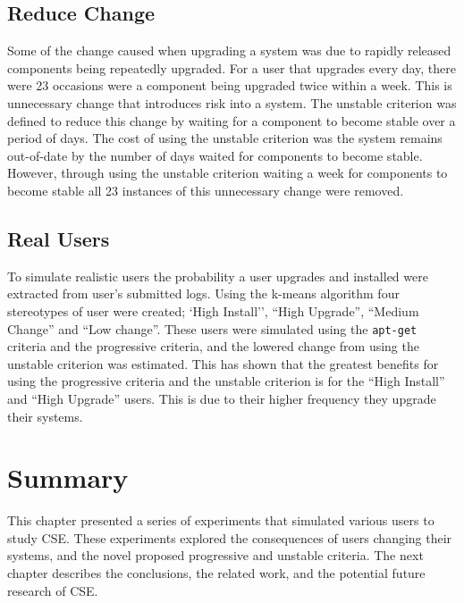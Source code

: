 \subsection{Reduce Change}
Some of the change caused when upgrading a system was due to rapidly released components being repeatedly upgraded.
For a user that upgrades every day, there were 23 occasions were a component being upgraded twice within a week.
This is unnecessary change that introduces risk into a system. 
The unstable criterion was defined to reduce this change by waiting for a component to become stable over a period of days.
The cost of using the unstable criterion was the system remains out-of-date by the number of days waited for components to become stable.
However, through using the unstable criterion waiting a week for components to become stable all 23 instances of this unnecessary change were removed.

\subsection{Real Users}
To simulate realistic users the probability a user upgrades and installed were extracted from user's submitted logs.
Using the k-means algorithm four stereotypes of user were created; `High Install'', ``High Upgrade'', ``Medium Change'' and ``Low change''.
These users were simulated using the \texttt{apt-get} criteria and the progressive criteria, and the lowered change from using the unstable criterion was estimated.
This has shown that the greatest benefits for using the progressive criteria and the unstable criterion is for the ``High Install'' and ``High Upgrade'' users.
This is due to their higher frequency they upgrade their systems.

\section{Summary}
This chapter presented a series of experiments that simulated various users to study CSE.
These experiments explored the consequences of users changing their systems, and the novel proposed progressive and unstable criteria.
The next chapter describes the conclusions, the related work, and the potential future research of CSE.



